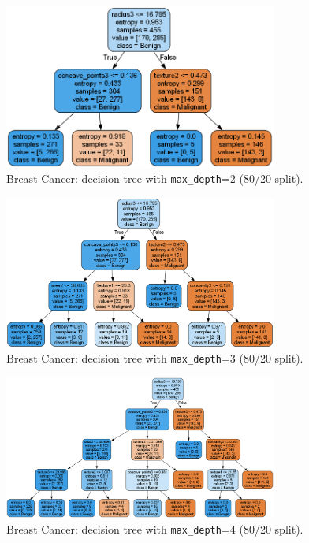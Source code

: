 \begin{figure}[H]
	\centering
	\includegraphics[width=0.8\textwidth]{imgs/dt/dt__breast_cancer__80_vs_20__2.png}
	\caption{Breast Cancer: decision tree with \texttt{max\_depth}=2 (80/20 split).}
	\label{fig:bc-dt-depth-2}
\end{figure}

\begin{figure}[H]
	\centering
	\includegraphics[width=0.8\textwidth]{imgs/dt/dt__breast_cancer__80_vs_20__3.png}
	\caption{Breast Cancer: decision tree with \texttt{max\_depth}=3 (80/20 split).}
	\label{fig:bc-dt-depth-3}
\end{figure}

\begin{figure}[H]
	\centering
	\includegraphics[width=0.8\textwidth]{imgs/dt/dt__breast_cancer__80_vs_20__4.png}
	\caption{Breast Cancer: decision tree with \texttt{max\_depth}=4 (80/20 split).}
	\label{fig:bc-dt-depth-4}
\end{figure}

